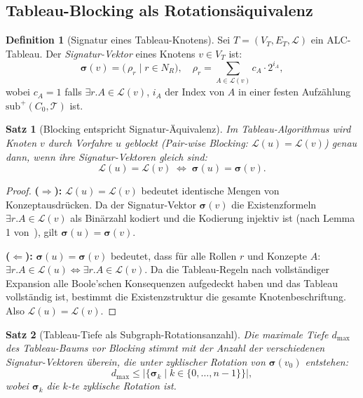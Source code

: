 ﻿\documentclass[a4paper,12pt]{article}
\theoremstyle{definition}
\newtheorem{definition}{Definition}[section]
\theoremstyle{plain}
\newtheorem{satz}{Satz}[section]
\theoremstyle{remark}
\newcommand{\Tbox}{\ensuremath{\mathcal{T}}}
\begin{document}
\subsection{Tableau-Blocking als Rotations{\"a}quivalenz}
\label{sec:blocking-rotation}

\begin{definition}[Signatur eines Tableau-Knotens]
\label{def:tableau-sig}
Sei $T = (V_T, E_T, \mathcal{L})$ ein \textsf{ALC}-Tableau.
Der \emph{Signatur-Vektor} eines Knotens $v \in V_T$ ist:
\[
  \boldsymbol{\sigma}(v)
  = \bigl(\,\rho_r \mid r \in N_R\bigr),
  \quad
  \rho_r = \sum_{A \in \mathcal{L}(v)} c_A \cdot 2^{i_A},
\]
wobei $c_A = 1$ falls $\exists r.A \in \mathcal{L}(v)$,
$i_A$ der Index von $A$ in einer festen Aufz{\"a}hlung
$\mathrm{sub}^+(C_0, \Tbox)$ ist.
\end{definition}

\begin{satz}[Blocking entspricht Signatur-{\"A}quivalenz]
\label{satz:blocking-aequiv}
Im Tableau-Algorithmus wird Knoten $v$ durch Vorfahre $u$ geblockt
(Pair-wise Blocking: $\mathcal{L}(u) = \mathcal{L}(v)$)
genau dann, wenn ihre Signatur-Vektoren gleich sind:
\[
  \mathcal{L}(u) = \mathcal{L}(v)
  \;\iff\;
  \boldsymbol{\sigma}(u) = \boldsymbol{\sigma}(v).
\]
\end{satz}

\begin{proof}
\textbf{($\Rightarrow$):}
$\mathcal{L}(u) = \mathcal{L}(v)$ bedeutet identische Mengen
von Konzeptausdr{\"u}cken.
Da der Signatur-Vektor $\boldsymbol{\sigma}(v)$ die Existenzformeln
$\exists r.A \in \mathcal{L}(v)$ als Bin{\"a}rzahl kodiert
und die Kodierung injektiv ist (nach Lemma 1 von~\cite{Epp2026}),
gilt $\boldsymbol{\sigma}(u) = \boldsymbol{\sigma}(v)$.

\textbf{($\Leftarrow$):}
$\boldsymbol{\sigma}(u) = \boldsymbol{\sigma}(v)$ bedeutet,
dass f{\"u}r alle Rollen $r$ und Konzepte $A$:
$\exists r.A \in \mathcal{L}(u) \Leftrightarrow \exists r.A \in \mathcal{L}(v)$.
Da die Tableau-Regeln nach vollst{\"a}ndiger Expansion alle
Boole'schen Konsequenzen aufgedeckt haben und das Tableau
vollst{\"a}ndig ist, bestimmt die Existenzstruktur die gesamte
Knotenbeschriftung. Also $\mathcal{L}(u) = \mathcal{L}(v)$.
\qedhere
\end{proof}

\begin{satz}[Tableau-Tiefe als Subgraph-Rotationsanzahl]
\label{satz:tableau-tiefe}
Die maximale Tiefe $d_{\max}$ des Tableau-Baums vor Blocking
stimmt mit der Anzahl der verschiedenen Signatur-Vektoren
{\"u}berein, die unter zyklischer Rotation von $\boldsymbol{\sigma}(v_0)$
entstehen:
\[
  d_{\max} \leq |\{\boldsymbol{\sigma}_k \mid k \in \{0,\ldots,n-1\}\}|,
\]
wobei $\boldsymbol{\sigma}_k$ die $k$-te zyklische Rotation ist.
\end{satz}
\end{document}

